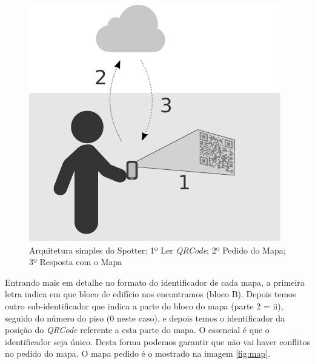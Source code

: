\documentclass[twocolumn,twoside,11pt]{article}
\newcommand{\qrcode}{\emph{QRCode}}
\begin{document}
  \begin{figure}[width=\textwidth]
    \begin{center}
      \includegraphics{arch.pdf}
    \end{center}
    \caption{Arquitetura simples do Spotter: 1º Ler \qrcode; 2º Pedido do Mapa; 3º Resposta com o Mapa}
    \label{fig:arch}
  \end{figure}

  Entrando mais em detalhe no formato do identificador de cada mapa, a primeira letra indica em que bloco de edifício nos encontramos (bloco B).
  Depois temos outro sub-identificador que indica a parte do bloco do mapa (parte 2 = ii), seguido do número do piso (0 neste caso), e depois temos o identificador da posição do \qrcode{} referente a esta parte do mapa.
  O essencial é que o identificador seja único.
  Desta forma podemos garantir que não vai haver conflitos no pedido do mapa.
  O mapa pedido é o mostrado na imagem \ref{fig:map}.
\end{document}
